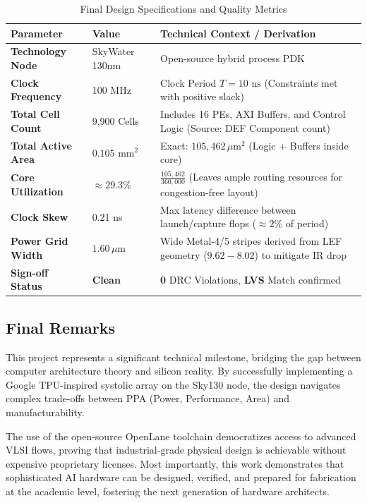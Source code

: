 \documentclass[12pt,a4paper]{article}
\begin{document}
\begin{table}[H]
\centering
\caption{Final Design Specifications and Quality Metrics}
\label{tab:final_metrics}
\begin{tabular}{@{}llp{6cm}@{}}
\toprule
\textbf{Parameter} & \textbf{Value} & \textbf{Technical Context / Derivation} \\
\midrule
\textbf{Technology Node} & SkyWater 130nm & Open-source hybrid process PDK \\
\midrule
\textbf{Clock Frequency} & 100 MHz & Clock Period $T = 10 \text{ ns}$ (Constraints met with positive slack) \\
\midrule
\textbf{Total Cell Count} & 9,900 Cells & Includes 16 PEs, AXI Buffers, and Control Logic (Source: DEF Component count) \\
\midrule
\textbf{Total Active Area} & $0.105 \text{ mm}^2$ & Exact: $105,462 \, \mu\text{m}^2$ (Logic + Buffers inside core) \\
\midrule
\textbf{Core Utilization} & $\approx 29.3\%$ & $\frac{105,462}{360,000}$ (Leaves ample routing resources for congestion-free layout) \\
\midrule
\textbf{Clock Skew} & 0.21 ns & Max latency difference between launch/capture flops ($\approx 2\%$ of period) \\
\midrule
\textbf{Power Grid Width} & $1.60 \, \mu\text{m}$ & Wide Metal-4/5 stripes derived from LEF geometry ($9.62 - 8.02$) to mitigate IR drop \\
\midrule
\textbf{Sign-off Status} & \textbf{Clean} & \textbf{0} DRC Violations, \textbf{LVS} Match confirmed \\
\bottomrule
\end{tabular}
\end{table}

\subsection{Final Remarks}

This project represents a significant technical milestone, bridging the gap between computer architecture theory and silicon reality. By successfully implementing a Google TPU-inspired systolic array on the Sky130 node, the design navigates complex trade-offs between PPA (Power, Performance, Area) and manufacturability.

The use of the open-source OpenLane toolchain democratizes access to advanced VLSI flows, proving that industrial-grade physical design is achievable without expensive proprietary licenses. Most importantly, this work demonstrates that sophisticated AI hardware can be designed, verified, and prepared for fabrication at the academic level, fostering the next generation of hardware architects.

\vspace{1cm}
\end{document}
